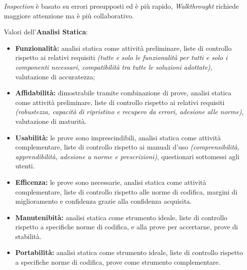 \textit{Inspection} è basato su errori presupposti ed è più rapido, \textit{Walkthrought} richiede maggiore attenzione ma è più collaborativo.

Valori dell'\textbf{Analisi Statica}:

\begin{itemize}
	\item \textbf{Funzionalità:} analisi statica come attività preliminare, liste di controllo rispetto ai relativi requisiti \textit{(tutte e solo le funzionalità per tutti e solo i componenti necessari, compatibilità tra tutte le soluzioni adottate)}, valutazione di accuratezza;
	\item \textbf{Affidabilità:} dimostrabile tramite combinazione di prove, analisi statica come attività preliminare, liste di controllo rispetto ai relativi requisiti \textit{(robustezza, capacità di ripristino e recupero da errori, adesione alle norme)}, valutazione di maturità.
	\item \textbf{Usabilità:} le prove sono imprescindibili, analisi statica come attività complementare, liste di controllo rispetto ai manuali d'uso \textit{(comprensibilità, apprendibilità, adesione a norme e prescrizioni)}, questionari sottomessi agli utenti.
	\item \textbf{Efficenza:} le prove sono necessarie, analisi statica come attività complementare, liste di controllo rispetto alle norme di codifica, margini di miglioramento e confidenza grazie alla confidenza acquisita.
	\item \textbf{Manutenibità:} analisi statica come strumento ideale, liste di controllo rispetto a specifiche norme di codifica, e alla prove per accertarne, prove di stabilità.
	\item \textbf{Portabilità:} analisi statica come strumento ideale, liste di controllo rispetto a specifiche norme di codifica, prove come strumento complementare.
\end{itemize}


